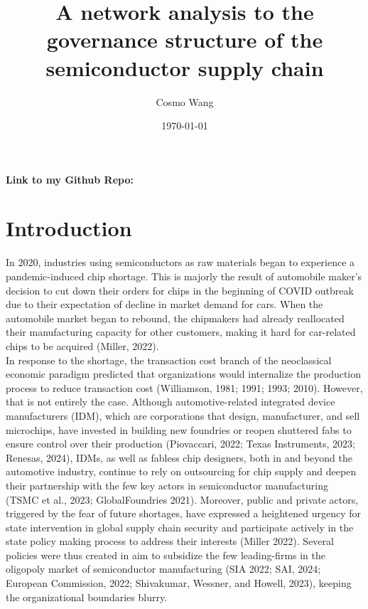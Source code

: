 \documentclass[12pt]{article}
\title{A network analysis to the governance structure of the semiconductor supply chain }
\author{Cosmo Wang}
\date{\today}
\begin{document}
\maketitle

\textbf{Link to my Github Repo:} \href{https://github.com/Cosmo280/organizational-network-analysis}
\\
\section*{\centering Introduction}
\textbf{}
\indent In 2020, industries using semiconductors as raw materials began to experience a pandemic-induced chip shortage. This is majorly the result of automobile maker’s decision to cut down their orders for chips in the beginning of COVID outbreak due to their expectation of decline in market demand for cars. When the automobile market began to rebound, the chipmakers had already reallocated their manufacturing capacity for other customers, making it hard for car-related chips to be acquired (Miller, 2022).\\ 
\indent In response to the shortage, the transaction cost branch of the neoclassical economic paradigm predicted that organizations would internalize the production process to reduce transaction cost (Williamson, 1981; 1991; 1993; 2010). However, that is not entirely the case. Although automotive-related integrated device manufacturers (IDM), which are corporations that design, manufacturer, and sell microchips, have invested in building new foundries or reopen shuttered fabs to ensure control over their production (Piovaccari, 2022; Texas Instruments, 2023; Renesas, 2024), IDMs, as well as fabless chip designers, both in and beyond the automotive industry, continue to rely on outsourcing for chip supply and deepen their partnership with the few key actors in semiconductor manufacturing (TSMC et al., 2023; GlobalFoundries 2021). Moreover, public and private actors, triggered by the fear of future shortages, have expressed a heightened urgency for state intervention in global supply chain security and participate actively in the state policy making process to address their interests (Miller 2022). Several policies were thus created in aim to subsidize the few leading-firms in the oligopoly market of semiconductor manufacturing (SIA 2022; SAI, 2024; European Commission, 2022; Shivakumar, Wessner, and Howell, 2023), keeping the organizational boundaries blurry.\\ 
\end{document}
